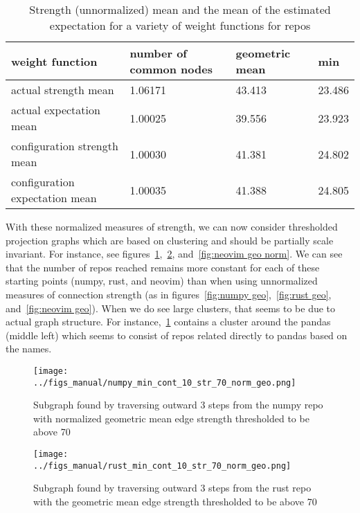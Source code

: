 \documentclass{pset}
\begin{document}
\begin{table}[ht]
\begin{tabular}{l|lll}
 weight function                & number of common nodes & geometric mean & min \\\hline
 actual strength mean           & 1.06171                & 43.413         & 23.486 \\\hline
 actual expectation mean        & 1.00025                & 39.556         & 23.923 \\\hline
 configuration strength mean    & 1.00030                & 41.381         & 24.802 \\\hline
 configuration expectation mean & 1.00035                & 41.388         & 24.805 \\\hline
\end{tabular}
\caption{Strength (unnormalized) mean and the mean of the estimated expectation for a
        variety of weight functions for repos}\label{tab:mean var norm}
\end{table}

With these normalized measures of strength, we can now consider thresholded
projection graphs which are based on clustering and should be partially scale
invariant. For instance, see figures~\ref{fig:numpy geo norm},~\ref{fig:rust geo norm},
and~\ref{fig:neovim geo norm}.  
We can see that the number of repos reached remains more constant for each of these
starting points (numpy, rust, and neovim)
than when using unnormalized measures of connection
strength (as in figures~\ref{fig:numpy geo},~\ref{fig:rust geo},
and~\ref{fig:neovim geo}). When we do see large clusters,
that seems to be due to actual graph structure. For instance,~\ref{fig:numpy geo norm}
contains a cluster around the pandas (middle left) which seems to consist
of repos related directly to pandas based on the names.

\begin{figure}[ht]
\centering
\texttt{[image: ../figs\_manual/numpy\_min\_cont\_10\_str\_70\_norm\_geo.png]}
\caption{Subgraph found by traversing outward 3 steps from the numpy repo with
normalized geometric mean edge strength thresholded to be above 
70}\label{fig:numpy geo norm}
\end{figure}

\begin{figure}[ht]
\centering
\texttt{[image: ../figs\_manual/rust\_min\_cont\_10\_str\_70\_norm\_geo.png]}
\caption{Subgraph found by traversing outward 3 steps from the rust repo with
    the geometric mean edge strength thresholded to be above 70}\label{fig:rust geo norm}
\end{figure}
\end{document}
